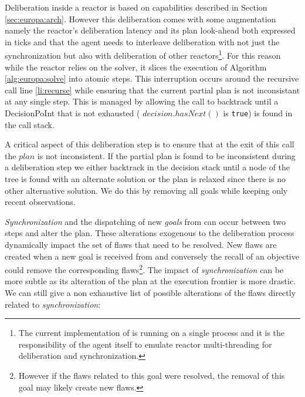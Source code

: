 Deliberation inside a reactor is based on \eu capabilities described
in Section \ref{sec:europa:arch}. However this deliberation comes with
some augmentation namely the reactor's deliberation latency and its
plan look-ahead both expressed in ticks and that the agent needs to
interleave deliberation with not just the synchronization but also
with deliberation of other reactors\footnote{The current
  implementation of \rx is running on a single process and it is the
  responsibility of the agent itself to emulate reactor
  multi-threading for deliberation and synchronization.}.  For this
reason while the reactor relies on the \eu solver, it slices the
execution of Algorithm \ref{alg:europa:solve} into atomic steps. This
interruption occurs around the recursive call line \ref{li:recurse}
while ensuring that the current partial plan is not inconsistant at
any single step. This is managed by allowing the call to backtrack
until a \textsf{DecisionPoInt} that is not exhausted (\ie
$decision.hasNext()$ is \texttt{true}) is found in the call stack.

A critical aspect of this deliberation step is to ensure that at the
exit of this call the $plan$ is not inconsistent. %
If the partial plan is found to be inconsistent during a deliberation
step we either backtrack in the decision stack until a node of the
tree is found with an alternate solution or the plan is relaxed since
there is no other alternative solution. We do this by removing all
goals while keeping only recent observations. 

{\em Synchronization} and the dispatching of new {\em goals} from \rx
can occur between two steps and alter the plan. These alterations
exogenous to the deliberation process dynamically impact the set of
flaws that need to be resolved. New flaws are created when a new goal
is received from \rx and conversely the recall of an objective could
remove the corresponding flaws\footnote{However if the flaws related
  to this goal were resolved, the removal of this goal may likely
  create new flaws.}. The impact of {\em synchronization} can be more
subtle as its alteration of the plan at the execution frontier is more
drastic. We can still give a non exhaustive list of possible
alterations of the flaws directly related to {\em synchronization}:


